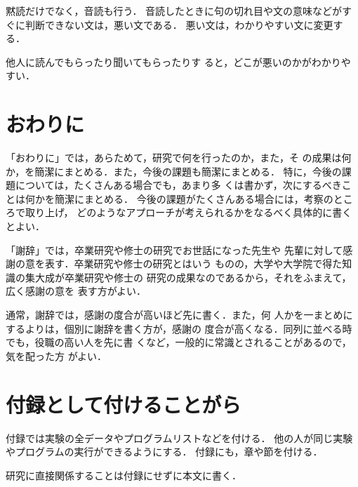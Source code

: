 \documentclass[11pt,master]{oecu-thesis}
\begin{document}
黙読だけでなく，音読も行う．
音読したときに句の切れ目や文の意味などがすぐに判断できない文は，悪い文である．
悪い文は，わかりやすい文に変更する．

他人に読んでもらったり聞いてもらったりす
ると，どこが悪いのかがわかりやすい．

\chapter{おわりに}

「おわりに」では，あらためて，研究で何を行ったのか，また，そ
の成果は何か，を簡潔にまとめる．また，今後の課題も簡潔にまとめる．
特に，今後の課題については，たくさんある場合でも，あまり多
くは書かず，次にするべきことは何かを簡潔にまとめる．
今後の課題がたくさんある場合には，考察のところで取り上げ，
どのようなアプローチが考えられるかをなるべく具体的に書く
とよい．


\acknowledgment

「謝辞」では，卒業研究や修士の研究でお世話になった先生や
先輩に対して感謝の意を表す．卒業研究や修士の研究とはいう
ものの，大学や大学院で得た知識の集大成が卒業研究や修士の
研究の成果なのであるから，それをふまえて，広く感謝の意を
表す方がよい．

通常，謝辞では，感謝の度合が高いほど先に書く．また，何
人かを一まとめにするよりは，個別に謝辞を書く方が，感謝の
度合が高くなる．同列に並べる時でも，役職の高い人を先に書
くなど，一般的に常識とされることがあるので，気を配った方
がよい．




\appendix
\chapter{付録として付けることがら}

付録では実験の全データやプログラムリストなどを付ける．
他の人が同じ実験やプログラムの実行ができるようにする．
付録にも，章や節を付ける．

研究に直接関係することは付録にせずに本文に書く．
\end{document}
